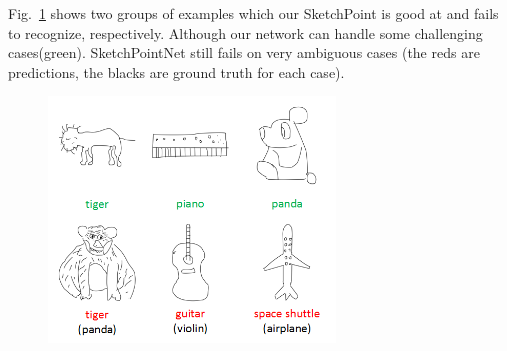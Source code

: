 Fig.~\ref{fig:resshow} shows two groups of examples which our SketchPoint is good at and fails to recognize, respectively.
Although our network can handle some challenging cases(green). SketchPointNet still fails on very ambiguous cases (the reds are predictions, the blacks are ground truth for each case).

\begin{figure}[htbp]
    \center
    \includegraphics[width=3in]{images/res.png}
    \label{fig:resshow}
\end{figure}
